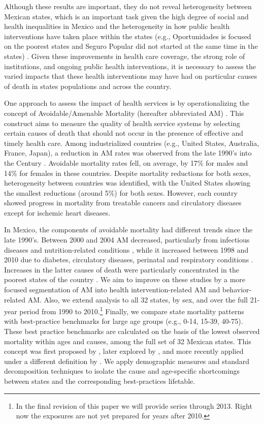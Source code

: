 \documentclass{article}
\begin{document}
 Although these results are important, they do not reveal heterogeneity between
 Mexican states, which is an important task given the high degree of social and
 health inequalities in Mexico and the heterogeneity in how public health interventions have taken place within the states (e.g., Oportunidades is focused on the poorest states and Seguro Popular did not started at the same time in the states) \citep{Frenk2006}.  Given these improvements
 in health care coverage, the strong role of institutions, and ongoing public
 health interventions, it is necessary to assess the varied impacts that
 these health interventions may have had on particular causes of death in states
 populations and across the country.
 
 One approach to assess the impact of health services is by operationalizing the
 concept of Avoidable/Amenable Mortality (hereafter abbreviated AM)
 \citep{nolte&mckee2004, nolte&mckee2008}. This construct aims to measure the quality of health service systems by selecting certain
 causes of death that should not occur in the presence of effective and
 timely health care. Among industrialized countries (e.g., United States,
 Australia, France, Japan), a reduction in AM rates was
 observed from the late 1990's into the  Century
 \citep{nolte&mckee2008}. Avoidable mortality rates fell, on average, by 17\%
 for males and 14\% for females in these countries. Despite mortality reductions for
 both sexes, heterogeneity between countries was identified, with the United
 States showing the smallest reductions (around 5\%) for both sexes. However,
 each country showed progress in mortality from treatable cancers and
 circulatory diseases except for ischemic heart diseases.

In Mexico, the components of avoidable mortality had different trends since the
late 1990's. Between 2000 and 2004 AM decreased, particularly from
infectious diseases and nutrition-related conditions \citep{francomarina2006}, while it increased between 1998 and 2010 due to diabetes, circulatory diseases, perinatal and respiratory conditions
\citep{agudelo2014efecto}. Increases in the latter causes
of death were particularly concentrated in the poorest states of the country
\citep{davila2014mortalidad}. We aim to improve on these studies
by a more focused segmentation of AM into health intervention-related AM and
behavior-related AM. Also, we extend analysis to all 32 states, by sex, and over
the full 21-year period from 1990 to 2010.\footnote{In the final revision of
this paper we will provide series through 2013. Right now the exposures are not
yet prepared for years after 2010.} Finally, we compare state mortality patterns
with best-practice benchmarks for large age groups (e.g., 0-14, 15-39, 40-75). These best practice
benchmarks are calculated on the basis of the lowest observed mortality within
ages and causes, among the full set of 32 Mexican states. This concept was first
proposed by \citet{wunsch1975minimum}, later explored by
\citet{vallin2008minimum}, and more recently applied under a different
definition by \citet{eikemo2014}. We apply demographic measures and
standard decomposition techniques to isolate the cause and age-specific shortcomings between states and the corresponding best-practices lifetable. 
\end{document}
